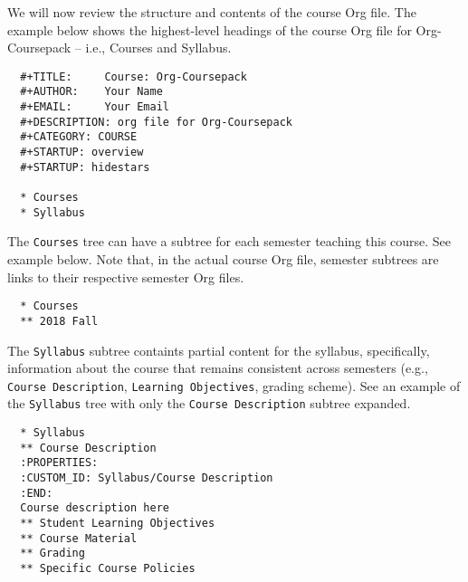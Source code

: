 \documentclass[10pt,article]{article}
\begin{document}
We will now review the structure and contents of the course Org
file. The example below shows the highest-level headings of the course
Org file for Org-Coursepack -- i.e., Courses and Syllabus.

\begin{verbatim}
  #+TITLE:     Course: Org-Coursepack
  #+AUTHOR:    Your Name
  #+EMAIL:     Your Email
  #+DESCRIPTION: org file for Org-Coursepack
  #+CATEGORY: COURSE
  #+STARTUP: overview
  #+STARTUP: hidestars
  
  * Courses
  * Syllabus
\end{verbatim}

The \texttt{Courses} tree can have a subtree for each semester teaching this
course. See example below. Note that, in the actual course Org file,
semester subtrees are links to their respective semester Org files.

\begin{verbatim}
  * Courses
  ** 2018 Fall
\end{verbatim}

The \texttt{Syllabus} subtree containts partial content for the syllabus,
specifically, information about the course that remains consistent
across semesters (e.g., \texttt{Course Description}, \texttt{Learning
Objectives}, grading scheme). See an example of the \texttt{Syllabus}
tree with only the \texttt{Course Description} subtree expanded.

\begin{verbatim}
  * Syllabus
  ** Course Description
  :PROPERTIES:
  :CUSTOM_ID: Syllabus/Course Description
  :END:
  Course description here
  ** Student Learning Objectives
  ** Course Material
  ** Grading
  ** Specific Course Policies
\end{verbatim}
\end{document}
